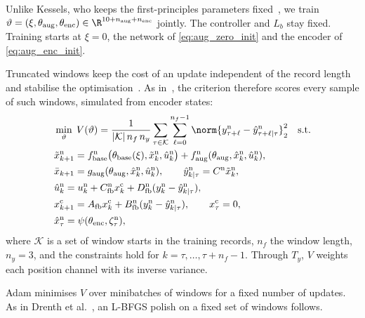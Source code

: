 Unlike Kessels, who keeps the first-principles parameters
fixed~\cite[Eq.~(5.12)]{kessels2025ai}, we train
$\vartheta=(\xi,\theta_{\mathrm{aug}},\theta_{\mathrm{enc}})
\in\R^{10+n_{\mathrm{aug}}+n_{\mathrm{enc}}}$ jointly.
The controller and $L_b$ stay fixed.
Training starts at $\xi=0$, the network of \eqref{eq:aug_zero_init} and the
encoder of \eqref{eq:aug_enc_init}.

Truncated windows keep the cost of an update independent of the record length
and stabilise the optimisation~\cite[Secs.~2, 3]{beintema2023subnet}.
As in~\cite[Eq.~(22)]{hoekstra2026lfr}, the criterion therefore scores every
sample of such windows, simulated from encoder states:
\begin{equation}
\begin{aligned}
 &\min_{\vartheta}\;V(\vartheta)=\frac{1}{|\mathcal K|\,n_f\,n_y}
 \sum_{\tau\in\mathcal K}\sum_{\ell=0}^{n_f-1}
 \norm{y^{\mathrm n}_{\tau+\ell}-\hat y^{\mathrm n}_{\tau+\ell|\tau}}_2^2
 \quad\text{s.t.}\\
 &\tilde x^{\mathrm n}_{k+1}
 =f^{\mathrm n}_{\mathrm{base}}\bigl(\theta_{\mathrm{base}}(\xi),\tilde x^{\mathrm n}_k,\hat u^{\mathrm n}_k\bigr)
  +f^{\mathrm n}_{\mathrm{aug}}(\theta_{\mathrm{aug}},\hat x^{\mathrm n}_k,\hat u^{\mathrm n}_k),\\
 &\bar x_{k+1}=g_{\mathrm{aug}}(\theta_{\mathrm{aug}},\hat x^{\mathrm n}_k,\hat u^{\mathrm n}_k),
 \qquad \hat y^{\mathrm n}_{k|\tau}=C^{\mathrm n}\tilde x^{\mathrm n}_k,\\
 &\hat u^{\mathrm n}_k=u^{\mathrm n}_k+C^{\mathrm n}_{\mathrm{fb}}x^{\mathrm c}_k
 +D^{\mathrm n}_{\mathrm{fb}}(y^{\mathrm n}_k-\hat y^{\mathrm n}_{k|\tau}),\\
 &x^{\mathrm c}_{k+1}=A_{\mathrm{fb}}x^{\mathrm c}_k
 +B^{\mathrm n}_{\mathrm{fb}}(y^{\mathrm n}_k-\hat y^{\mathrm n}_{k|\tau}),
 \qquad x^{\mathrm c}_\tau=0,\\
 &\hat x^{\mathrm n}_\tau=\psi(\theta_{\mathrm{enc}},\zeta^{\mathrm n}_\tau),
\end{aligned}
\label{eq:aug_loss}
\end{equation}
where $\mathcal K$ is a set of window starts in the training records,
$n_f$ the window length, $n_y=3$, and the constraints hold for
$k=\tau,\dots,\tau+n_f-1$.
Through $T_y$, $V$ weights each position channel with its inverse variance.

Adam minimises $V$ over minibatches of windows for a fixed number of updates.
As in Drenth et al.~\cite[Sec.~5]{drenth2025lpvlfr}, an L-BFGS polish on a
fixed set of windows follows.

